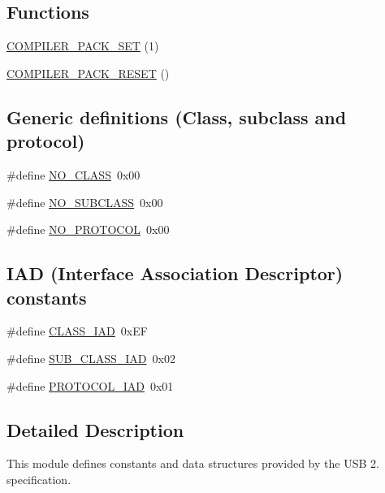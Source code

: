 \subsection*{\-Functions}
\begin{DoxyCompactItemize}
\item 
\hyperlink{group__usb__protocol__group_ga14096700b3ed8c5168615c5c5ee1c68d}{\-C\-O\-M\-P\-I\-L\-E\-R\-\_\-\-P\-A\-C\-K\-\_\-\-S\-E\-T} (1)
\item 
\hyperlink{group__usb__protocol__group_gabe317a1520896eaf568afab27dc71540}{\-C\-O\-M\-P\-I\-L\-E\-R\-\_\-\-P\-A\-C\-K\-\_\-\-R\-E\-S\-E\-T} ()
\end{DoxyCompactItemize}
\subsection*{\-Generic definitions (\-Class, subclass and protocol)}
\begin{DoxyCompactItemize}
\item 
\#define \hyperlink{group__usb__protocol__group_ga6ce548e51895ce0226ee145753a9c815}{\-N\-O\-\_\-\-C\-L\-A\-S\-S}~0x00
\item 
\#define \hyperlink{group__usb__protocol__group_gaac34c41004ffdf924a770974fd4152d7}{\-N\-O\-\_\-\-S\-U\-B\-C\-L\-A\-S\-S}~0x00
\item 
\#define \hyperlink{group__usb__protocol__group_gaa5e6e8476d28aa6869786f87751144d0}{\-N\-O\-\_\-\-P\-R\-O\-T\-O\-C\-O\-L}~0x00
\end{DoxyCompactItemize}
\subsection*{\-I\-A\-D (\-Interface \-Association \-Descriptor) constants}
\begin{DoxyCompactItemize}
\item 
\#define \hyperlink{group__usb__protocol__group_gae8971589b19dfa71052d651617324566}{\-C\-L\-A\-S\-S\-\_\-\-I\-A\-D}~0x\-E\-F
\item 
\#define \hyperlink{group__usb__protocol__group_gaa4e56ac456064b641e2a3a58ea5a4ed3}{\-S\-U\-B\-\_\-\-C\-L\-A\-S\-S\-\_\-\-I\-A\-D}~0x02
\item 
\#define \hyperlink{group__usb__protocol__group_ga8e85bf6a9a6702c71c68dbc5c4164b9f}{\-P\-R\-O\-T\-O\-C\-O\-L\-\_\-\-I\-A\-D}~0x01
\end{DoxyCompactItemize}


\subsection{\-Detailed \-Description}
\-This module defines constants and data structures provided by the \-U\-S\-B 2. specification. 

